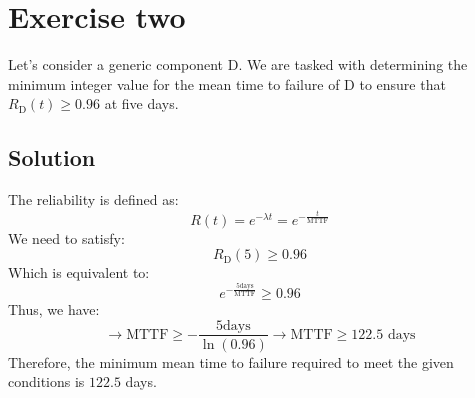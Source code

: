 \section{Exercise two}

Let's consider a generic component D. 
We are tasked with determining the minimum integer value for the mean time to failure of D to ensure that $R_{\text{D}}(t) \geq 0.96$ at five days.

\subsection*{Solution}
The reliability is defined as:
\[R(t)=e^{-\lambda t}=e^{-\frac{t}{\text{MTTF}}}\]
We need to satisfy:
\[R_{\text{D}}(5)\geq 0.96\]
Which is equivalent to:
\[e^{-\frac{5 \text{days}}{\text{MTTF}}}\geq 0.96\]
Thus, we have:
\[\rightarrow \text{MTTF}\geq -\frac{5 \text{days}}{\ln(0.96)}\rightarrow \text{MTTF}\geq 122.5 \text{ days}\]
Therefore, the minimum mean time to failure required to meet the given conditions is $122.5$ days.